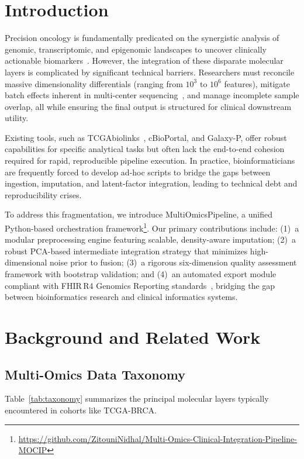 \documentclass[sigconf,nonacm]{acmart}
\begin{document}
\section{Introduction}
Precision oncology is fundamentally predicated on the synergistic analysis of genomic, transcriptomic, and epigenomic landscapes to uncover clinically actionable biomarkers~\cite{tomczak2015}. However, the integration of these disparate molecular layers is complicated by significant technical barriers. Researchers must reconcile massive dimensionality differentials (ranging from $10^3$ to $10^6$ features), mitigate batch effects inherent in multi-center sequencing~\cite{leek2010}, and manage incomplete sample overlap, all while ensuring the final output is structured for clinical downstream utility.

Existing tools, such as TCGAbiolinks~\cite{colaprico2016}, cBioPortal, and Galaxy-P, offer robust capabilities for specific analytical tasks but often lack the end-to-end cohesion required for rapid, reproducible pipeline execution. In practice, bioinformaticians are frequently forced to develop ad-hoc scripts to bridge the gaps between ingestion, imputation, and latent-factor integration, leading to technical debt and reproducibility crises.

To address this fragmentation, we introduce MultiOmicsPipeline, a unified Python-based orchestration framework\footnote{\url{https://github.com/ZitouniNidhal/Multi-Omics-Clinical-Integration-Pipeline-MOCIP}}. Our primary contributions include: (1)~a modular preprocessing engine featuring scalable, density-aware imputation; (2)~a robust PCA-based intermediate integration strategy that minimizes high-dimensional noise prior to fusion; (3)~a rigorous six-dimension quality assessment framework with bootstrap validation; and (4)~an automated export module compliant with FHIR\,R4 Genomics Reporting standards~\cite{mandel2016}, bridging the gap between bioinformatics research and clinical informatics systems.

\section{Background and Related Work}

\subsection{Multi-Omics Data Taxonomy}
Table~\ref{tab:taxonomy} summarizes the principal molecular layers typically encountered in cohorts like TCGA-BRCA.
\end{document}
